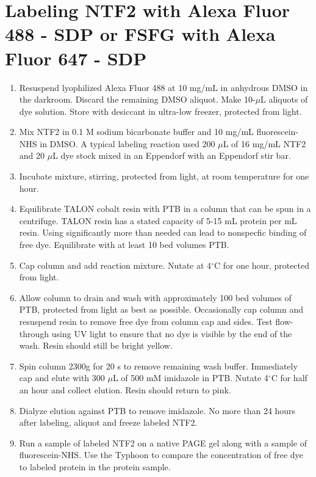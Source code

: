 \section{Labeling NTF2 with Alexa Fluor 488 - SDP or FSFG with Alexa Fluor 647 - SDP}
\begin{enumerate}
\item Resuspend lyophilized Alexa Fluor 488 at 10 mg/mL in anhydrous DMSO in the darkroom.  Discard the remaining DMSO aliquot.  Make 10-$\mu$L aliquots of dye solution. Store with desiccant in ultra-low freezer, protected from light.
\item Mix NTF2 in 0.1 M sodium bicarbonate buffer and 10 mg/mL fluorescein-NHS in DMSO.  A typical labeling reaction used 200 $\mu$L of 16 mg/mL NTF2 and 20 $\mu$L dye stock mixed in an Eppendorf with an Eppendorf stir bar.
\item Incubate mixture, stirring, protected from light, at room temperature for one hour.
\item Equilibrate TALON cobalt resin with PTB in a column that can be spun in a centrifuge.  TALON resin has a stated capacity of 5-15 mL protein per mL resin.  Using significantly more than needed can lead to nonspecfic binding of free dye.  Equilibrate with at least 10 bed volumes PTB.
\item Cap column and add reaction mixture.  Nutate at 4$^\circ$C for one hour, protected from light.
\item Allow column to drain and wash with approximately 100 bed volumes of PTB, protected from light as best as possible.  Occasionally cap column and resuspend resin to remove free dye from column cap and sides.  Test flow-through using UV light to ensure that no dye is visible by the end of the wash.  Resin should still be bright yellow.
\item Spin column 2300g for 20 s to remove remaining wash buffer.  Immediately cap and elute with 300 $\mu$L of 500 mM imidazole in PTB.  Nutate 4$^\circ$C for half an hour and collect elution.  Resin should return to pink.
\item Dialyze elution against PTB to remove imidazole.  No more than 24 hours after labeling, aliquot and freeze labeled NTF2.
\item Run a sample of labeled NTF2 on a native PAGE gel along with a sample of fluorescein-NHS.  Use the Typhoon to compare the concentration of free dye to labeled protein in the protein sample.
\end{enumerate}

